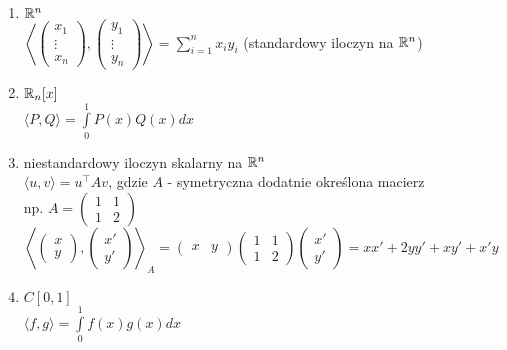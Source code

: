\begin{przy} \hfill 
    \begin{enumerate}[(1)] 
        \item $\mathbb{R}^n$ \\ 
            $\left \langle \begin{pmatrix} x_1 \\ \vdots \\ x_n \end{pmatrix}, 
                \begin{pmatrix} y_1 \\ \vdots \\ y_n \end{pmatrix} \right \rangle
            = \sum\limits_{i=1}^n x_i y_i$ (standardowy iloczyn na $\mathbb{R}^n$)
        \item $\mathbb{R}_n[x]$ \\ 
            $\langle P, Q \rangle = \int\limits_0^1 P(x) Q(x) dx$
        \item niestandardowy iloczyn skalarny na $\mathbb{R}^n$ \\ 
            $\langle u, v \rangle = u^\top A v$, gdzie $A$ - symetryczna dodatnie określona
            macierz \\ 
            np. $A = \begin{pmatrix} 1 & 1 \\ 1 & 2 \end{pmatrix}$ \\ 
            $\left \langle \begin{pmatrix} x \\ y \end{pmatrix}, 
                     \begin{pmatrix} x' \\ y' \end{pmatrix} \right \rangle_A = 
                     \begin{pmatrix} x & y \end{pmatrix}
                     \begin{pmatrix} 1 & 1 \\ 1 & 2 \end{pmatrix}
                     \begin{pmatrix} x' \\ y' \end{pmatrix} = xx' + 2yy' + xy' + x'y$
        \item $C[0,1]$ \\ 
            $\langle f, g \rangle = \int\limits_0^1 f(x)g(x) dx$
    \end{enumerate} 
\end{przy} 
